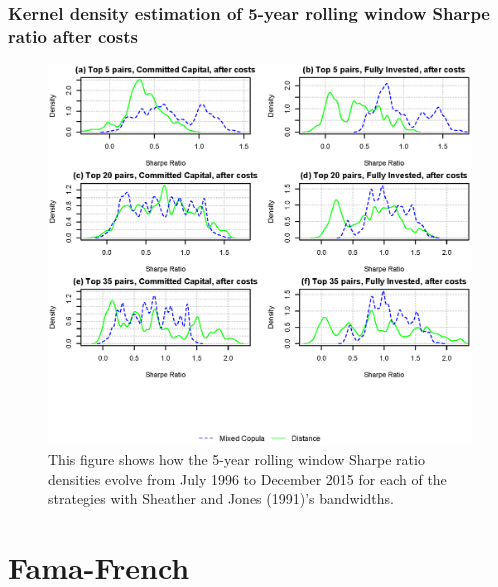 \documentclass[pdf,9pt,xcolor=dvipsnames,hide notes]{beamer}
\begin{document}
\begin{frame}[label=frame5c]
\frametitle{Kernel density estimation of 5-year rolling window Sharpe ratio after costs}

\begin{figure}[!ht]
	\centering
	\includegraphics[scale=0.52]{Figure5.eps}
	\captionsetup{justification=raggedright,
		singlelinecheck=false
	}
	\caption*{\tiny  This figure shows how the 5-year rolling window Sharpe ratio densities evolve from July 1996 to December 2015 for each of the strategies with Sheather and Jones (1991)'s bandwidths.}
	\label{fig:fig5}
\end{figure}

\end{frame}


\section{Fama-French}
\end{document}
